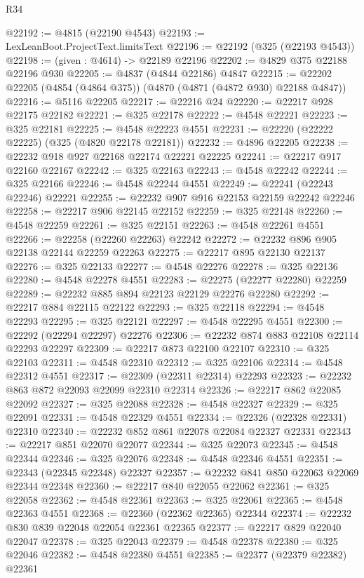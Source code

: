 \begin{lexlean}{R34}
\begin{coremodule}
@22192 := @4815 (@22190 @4543)
@22193 := LexLeanBoot.ProjectText.limitsText
@22196 := @22192 (@325 (@22193 @4543))
@22198 := (given : @4614) -> @22189 @22196
@22202 := @4829 @375 @22188 @22196 @930
@22205 := @4837 (@4844 @22186) @4847
@22215 := @22202 @22205 (@4854 (@4864 @375)) (@4870 (@4871 (@4872 @930) @22188 @4847))
@22216 := @5116 @22205
@22217 := @22216 @24
@22220 := @22217 @928 @22175 @22182
@22221 := @325 @22178
@22222 := @4548 @22221
@22223 := @325 @22181
@22225 := @4548 @22223 @4551
@22231 := @22220 (@22222 @22225) (@325 (@4820 @22178 @22181))
@22232 := @4896 @22205
@22238 := @22232 @918 @927 @22168 @22174 @22221 @22225
@22241 := @22217 @917 @22160 @22167
@22242 := @325 @22163
@22243 := @4548 @22242
@22244 := @325 @22166
@22246 := @4548 @22244 @4551
@22249 := @22241 (@22243 @22246) @22221
@22255 := @22232 @907 @916 @22153 @22159 @22242 @22246
@22258 := @22217 @906 @22145 @22152
@22259 := @325 @22148
@22260 := @4548 @22259
@22261 := @325 @22151
@22263 := @4548 @22261 @4551
@22266 := @22258 (@22260 @22263) @22242
@22272 := @22232 @896 @905 @22138 @22144 @22259 @22263
@22275 := @22217 @895 @22130 @22137
@22276 := @325 @22133
@22277 := @4548 @22276
@22278 := @325 @22136
@22280 := @4548 @22278 @4551
@22283 := @22275 (@22277 @22280) @22259
@22289 := @22232 @885 @894 @22123 @22129 @22276 @22280
@22292 := @22217 @884 @22115 @22122
@22293 := @325 @22118
@22294 := @4548 @22293
@22295 := @325 @22121
@22297 := @4548 @22295 @4551
@22300 := @22292 (@22294 @22297) @22276
@22306 := @22232 @874 @883 @22108 @22114 @22293 @22297
@22309 := @22217 @873 @22100 @22107
@22310 := @325 @22103
@22311 := @4548 @22310
@22312 := @325 @22106
@22314 := @4548 @22312 @4551
@22317 := @22309 (@22311 @22314) @22293
@22323 := @22232 @863 @872 @22093 @22099 @22310 @22314
@22326 := @22217 @862 @22085 @22092
@22327 := @325 @22088
@22328 := @4548 @22327
@22329 := @325 @22091
@22331 := @4548 @22329 @4551
@22334 := @22326 (@22328 @22331) @22310
@22340 := @22232 @852 @861 @22078 @22084 @22327 @22331
@22343 := @22217 @851 @22070 @22077
@22344 := @325 @22073
@22345 := @4548 @22344
@22346 := @325 @22076
@22348 := @4548 @22346 @4551
@22351 := @22343 (@22345 @22348) @22327
@22357 := @22232 @841 @850 @22063 @22069 @22344 @22348
@22360 := @22217 @840 @22055 @22062
@22361 := @325 @22058
@22362 := @4548 @22361
@22363 := @325 @22061
@22365 := @4548 @22363 @4551
@22368 := @22360 (@22362 @22365) @22344
@22374 := @22232 @830 @839 @22048 @22054 @22361 @22365
@22377 := @22217 @829 @22040 @22047
@22378 := @325 @22043
@22379 := @4548 @22378
@22380 := @325 @22046
@22382 := @4548 @22380 @4551
@22385 := @22377 (@22379 @22382) @22361

\end{coremodule}
\end{lexlean}
